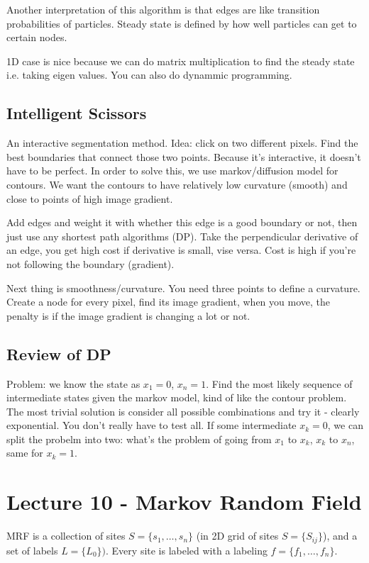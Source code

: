 Another interpretation of this algorithm is that edges are like
transition probabilities of particles. Steady state is defined by how
well particles can get to certain nodes.

1D case is nice because we can do matrix multiplication to find the
steady state i.e. taking eigen values. You can also do dynammic
programming. 

\subsection{Intelligent Scissors}
\label{sec:intelligent-scissors}
An interactive segmentation method. Idea: click on two different
pixels. Find the best boundaries that connect those two
points. Because it's interactive, it doesn't have to be perfect. In
order to solve this, we use markov/diffusion model for contours. We
want the contours to have relatively low curvature (smooth) and close
to points of high image gradient.

Add edges and weight it with whether this edge is a good boundary or
not, then just use any shortest path algorithms (DP).
Take the perpendicular derivative of an edge, you get high cost if
derivative is small, vise versa. Cost is high if you're not following
the boundary (gradient).

Next thing is smoothness/curvature. You need three points to define a
curvature. Create a node for every pixel, find its image gradient, when
you move, the penalty is if the image gradient is changing a lot or
not. 

\subsection{Review of DP}
\label{sec:review-dp}
Problem: we know the state as $x_1=0$, $x_n=1$. Find the most likely
sequence of intermediate states given the markov model, kind of like
the contour problem. The most trivial solution is consider all
possible combinations and try it - clearly exponential. You don't
really have to test all. If some intermediate $x_k=0$, we can split
the probelm into two: what's the problem of going from $x_1$ to $x_k$,
$x_k$ to $x_n$, same for $x_k=1$. 




\pagebreak

\section{Lecture 10 - Markov Random Field}
\label{sec:lecture-10-markov}
MRF is a collection of sites $S=\{ s_1, \dots, s_n\}$ (in 2D grid of
sites $S = \{S_{ij}\}$), and a set of labels $L=\{L_0\})$. Every site
is labeled with a labeling $f=\{f_1, \dots, f_n\}$.

